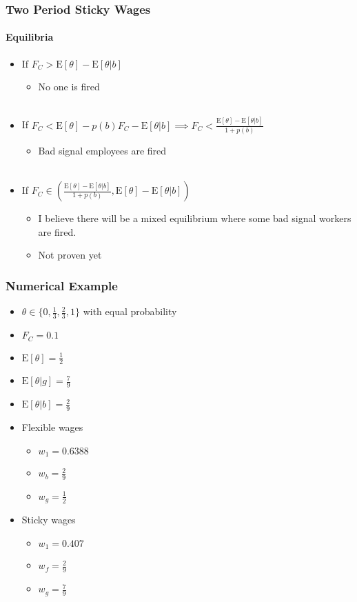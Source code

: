\documentclass{beamer}
\newcommand{\E}{\mathrm{E}}
\begin{document}
\begin{frame}
\frametitle{Two Period Sticky Wages}
\framesubtitle{Equilibria}

\begin{itemize}
	\setlength{\itemsep}{3mm}
	\item If $F_C > \E[\theta] - \E[\theta |b]$ 
	\begin{itemize}
		\item No one is fired \\~\\
	\end{itemize} 

	\item If  $F_C <\E[\theta] - p(b) F_C - \E[\theta |b] \implies F_C < \frac{\E[\theta] - \E[\theta|b]}{1+p(b)}$ 
	\begin{itemize}
		\item Bad signal employees are fired \\~\\
	\end{itemize}

	\item If $F_C \in \left( \frac{\E[\theta] - \E[\theta|b]}{1+p(b)}, \E[\theta] - \E[\theta |b] \right)$
	\begin{itemize}
		\item I believe there will be a mixed equilibrium where some bad signal workers are fired. 
		\item Not proven yet
	\end{itemize}
	
\end{itemize}

\end{frame}


\begin{frame}
\frametitle{Numerical Example}

\begin{itemize}
		\setlength{\itemsep}{2mm}
	\item $\theta \in \{0,\frac{1}{3}, \frac{2}{3}, 1\}$ with equal probability
	\item $F_C = 0.1$ 
	\item $\E[\theta] = \frac{1}{2}$
	\item $\E[ \theta | g] = \frac{7}{9}$
	\item $\E[ \theta | b] = \frac{2}{9}$
	\item Flexible wages 
	\begin{itemize}
			\setlength{\itemsep}{1mm}
		\item $w_1 = 0.6388$
		\item $w_b = \frac{2}{9}$
		\item $w_g = \frac{1}{2}$
	\end{itemize}
\item Sticky wages 
	\begin{itemize}
		\setlength{\itemsep}{1mm}
		\item $w_1 = 0.407$
		\item $w_f = \frac{2}{9}$
		\item $w_g = \frac{7}{9}$
	\end{itemize}
\end{itemize}

\end{frame}
\end{document}
